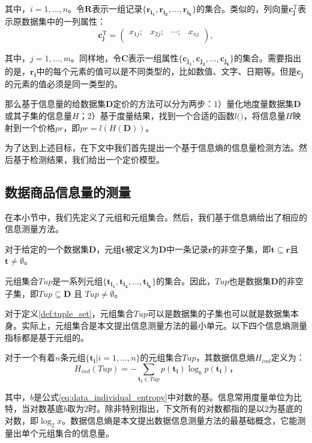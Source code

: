 其中，$i=1,...,n$。令$\bm{R}$表示一组记录$\{\bm{r_{i_1}},\bm{r_{i_2}},...,\bm{r_{i_k}}\}$的集合。类似的，列向量$\bm{c_j^\mathrm{T}}$表示原数据集中的一列属性：
\begin{equation}
 \bm{c_j^\mathrm{T}}=\left(
\begin{matrix}
 x_{1j};     &x_{2j};      &\cdots; &x_{nj}      \\
\end{matrix}
\right),
\end{equation}

其中，$j=1,...,m$。同样地，令$\bm{C}$表示一组属性$\{\bm{c_{j_1}},\bm{c_{j_2}},...,\bm{c_{j_k}}\}$的集合。需要指出的是，$\bm{r_i}$中的每个元素的值可以是不同类型的，比如数值、文字、日期等。但是$\bm{c_j}$的元素的值必须是同一类型的。

那么基于信息量的给数据集$\bm{D}$定价的方法可以分为两步：1）量化地度量数据集$\bm{D}$或其子集的信息量$H$；2）基于度量结果，找到一个合适的函数$l(\dot)$，将信息量$H$映射到一个价格$pr$，即$pr=l(H(\bm{D}))$。

为了达到上述目标，在下文中我们首先提出一个基于信息熵的信息量检测方法。然后基于检测结果，我们给出一个定价模型。

\subsection{数据商品信息量的测量}
在本小节中，我们先定义了元组和元组集合。然后，我们基于信息熵\cite{shannon2001mathematical}给出了相应的信息测量方法。

\begin{defn}[元组]
 对于给定的一个数据集$\bm{D}$，元组$\bm{t}$被定义为$\bm{D}$中一条记录$\bm{r}$的非空子集，即$\bm{t} \subseteq \bm{r}$且$\bm{t} \ne \emptyset$。
\end{defn}

\begin{defn}[元组集合]
元组集合$Tup$是一系列元组$\{\bm{t_{i_1}},\bm{t_{i_2}},...,\bm{t_{i_k}}\}$的集合。因此，$Tup$也是数据集$\bm{D}$的非空子集，即$Tup \subseteq \bm{D}$ 且 $Tup \ne \emptyset$。
\label{def:tuple_set}
\end{defn}

对于定义\ref{def:tuple_set}，元组集合$Tup$可以是数据集的子集也可以就是数据集本身。实际上，元组集合是本文提出信息测量方法的最小单元。以下四个信息熵测量指标都是基于元组的。

\begin{defn}[数据信息熵]
对于一个有着$n$条元组$\{\bm{t_i}$$|i=1,...,n\}$的元组集合$Tup$，其数据信息熵$H_{ind}$定义为：
\begin{equation}
  H_{ind}(Tup)=-\sum_{\bm{t_i} \in Tup}p(\bm{t_i})\log_{b}p(\bm{t_i})，
  \label{eq:data_individual_entropy}
\end{equation}
\label{def:data_individual_entropy}
\end{defn}
其中，$b$是公式\ref{eq:data_individual_entropy}中对数的基。信息常用度量单位为比特，当对数基底$b$取为$2$时。除非特别指出，下文所有的对数都指的是以$2$为基底的对数，即$\log_2x$。数据信息熵是本文提出数据信息测量方法的最基础概念，它能测量出单个元组集合的信息量。

